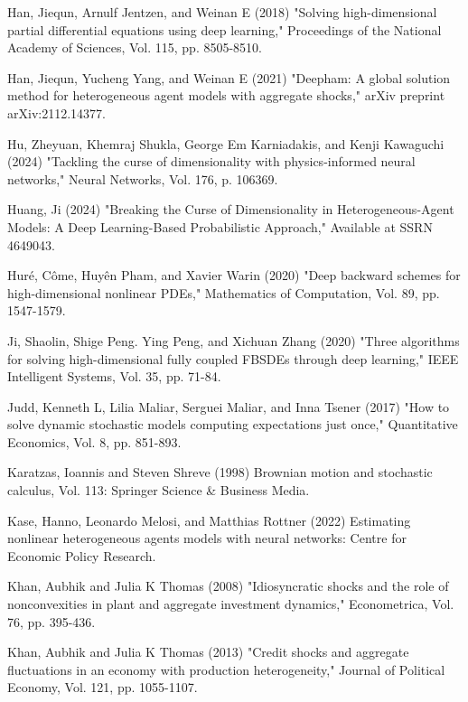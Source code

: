 \documentclass{article}
\begin{document}
\begin{thebibliography}{99}
 Han, Jiequn, Arnulf Jentzen, and Weinan E (2018) "Solving high-dimensional partial differential equations using deep learning," Proceedings of the National Academy of Sciences, Vol. 115, pp. 8505-8510.

 Han, Jiequn, Yucheng Yang, and Weinan E (2021) "Deepham: A global solution method for heterogeneous agent models with aggregate shocks," arXiv preprint arXiv:2112.14377.

 Hu, Zheyuan, Khemraj Shukla, George Em Karniadakis, and Kenji Kawaguchi (2024) "Tackling the curse of dimensionality with physics-informed neural networks," Neural Networks, Vol. 176, p. 106369.

 Huang, Ji (2024) "Breaking the Curse of Dimensionality in Heterogeneous-Agent Models: A Deep Learning-Based Probabilistic Approach," Available at SSRN 4649043.

 Huré, Côme, Huyên Pham, and Xavier Warin (2020) "Deep backward schemes for high-dimensional nonlinear PDEs," Mathematics of Computation, Vol. 89, pp. 1547-1579.

 Ji, Shaolin, Shige Peng. Ying Peng, and Xichuan Zhang (2020) "Three algorithms for solving high-dimensional fully coupled FBSDEs through deep learning," IEEE Intelligent Systems, Vol. 35, pp. 71-84.

 Judd, Kenneth L, Lilia Maliar, Serguei Maliar, and Inna Tsener (2017) "How to solve dynamic stochastic models computing expectations just once," Quantitative Economics, Vol. 8, pp. 851-893.

 Karatzas, Ioannis and Steven Shreve (1998) Brownian motion and stochastic calculus, Vol. 113: Springer Science \& Business Media.

 Kase, Hanno, Leonardo Melosi, and Matthias Rottner (2022) Estimating nonlinear heterogeneous agents models with neural networks: Centre for Economic Policy Research.

 Khan, Aubhik and Julia K Thomas (2008) "Idiosyncratic shocks and the role of nonconvexities in plant and aggregate investment dynamics," Econometrica, Vol. 76, pp. 395-436.

 Khan, Aubhik and Julia K Thomas (2013) "Credit shocks and aggregate fluctuations in an economy with production heterogeneity," Journal of Political Economy, Vol. 121, pp. 1055-1107.


\end{thebibliography}
\end{document}
